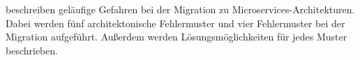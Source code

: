  beschreiben geläufige Gefahren bei der Migration zu Microservices-Architekturen.
Dabei  werden fünf architektonische Fehlermuster und vier Fehlermuster bei der Migration aufgeführt.
Außerdem werden Lösungsmöglichkeiten für jedes Muster beschrieben.

%
%

